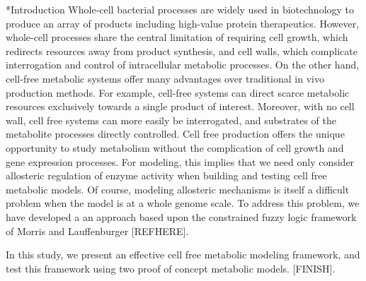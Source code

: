 \documentclass[12pt]{article}
\makeatletter
\renewcommand\section{\@startsection
	{subsection}{2}{0mm}
	{-0.2in}
	{0.05\baselineskip}
	{\normalfont\large\bfseries}}
\makeatother
\begin{document}
\section*{Introduction}
Whole-cell bacterial processes are widely used in biotechnology to produce an array of products including high-value protein therapeutics.
However, whole-cell processes share the central limitation of requiring cell growth, 
which redirects resources away from product synthesis, and cell walls, which complicate interrogation and control of intracellular metabolic processes.
On the other hand, cell-free metabolic systems offer many advantages over traditional in vivo production methods. 
For example, cell-free systems can direct scarce metabolic resources exclusively towards a single product of interest. 
Moreover, with no cell wall, cell free systems can more easily be interrogated, and substrates of the metabolite processes directly controlled.
Cell free production offers the unique opportunity to study metabolism without the complication of cell growth and gene expression processes.
For modeling, this implies that we need only consider allosteric regulation of enzyme activity when building and testing cell free metabolic models.
Of course, modeling allosteric mechanisms is itself a difficult problem when the model is at a whole genome scale. To address this problem, we have developed a
an approach based upon the constrained fuzzy logic framework of Morris and Lauffenburger [REFHERE].

In this study, we present an effective cell free metabolic modeling framework, and test this framework using two proof of concept metabolic models. 
[FINISH].

\clearpage
\end{document}
